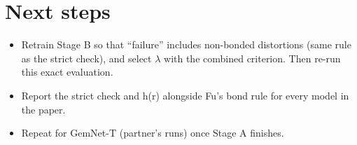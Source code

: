 \documentclass[10pt]{article}
\begin{document}
\section*{Next steps}
\begin{itemize}
  \item Retrain Stage B so that ``failure'' includes non-bonded distortions (same rule as the strict check),
        and select $\lambda$ with the combined criterion. Then re-run this exact evaluation.
  \item Report the strict check and h(r) alongside Fu's bond rule for every model in the paper.
  \item Repeat for GemNet-T (partner's runs) once Stage A finishes.
\end{itemize}
\end{document}
